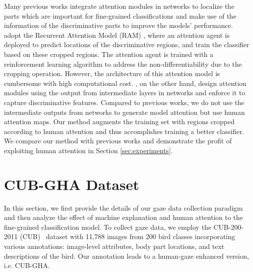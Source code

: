 \documentclass{bmvc2k}
\begin{document}
 Many previous works \cite{zheng2017learning, sun2018multi, liu2016fully,zhang2021multi,liu2017localizing,li2017dynamic,sermanet2014attention,fu2017look,zheng2019looking,zhuang2020learning,ji2020attention} integrate attention modules in networks to localize the parts which are important for fine-grained classifications and make use of the information of the discriminative parts to improve the models' performance.
\cite{liu2017localizing,sermanet2014attention,liu2016fully,li2017dynamic,fu2017look} adopt the Recurrent Attention Model (RAM) \cite{mnih2014recurrent}, where an attention agent is deployed to predict locations of the discriminative regions, and train the classifier based on these cropped regions. The attention agent is trained with a reinforcement learning algorithm to address the non-differentiability due to the cropping operation. However, the architecture of this attention model is cumbersome with high computational cost.
\cite{zheng2017learning, sun2018multi,zhang2021multi,zheng2019looking, zhuang2020learning, ji2020attention}, on the other hand, design attention modules using the output from intermediate layers in networks and enforce it to capture discriminative features. Compared to previous works, we do not use the intermediate outputs from networks to generate model attention but use human attention maps. Our method augments the training set with regions cropped according to human attention and thus accomplishes training a better classifier. We compare our method with previous works and demonstrate the profit of exploiting human attention in Section \ref{sec:experiments}.










\section{CUB-GHA Dataset}
\label{sec:dataset}
In this section, we first provide the details of our gaze data collection paradigm and then analyze the effect of machine explanation and human attention to the fine-grained classification model. 
To collect gaze data, we employ the CUB-200-2011 (CUB)~\cite{WahCUB_200_2011} dataset with 11,788 images from 200 bird classes incorporating various annotations: image-level attributes, body part locations, and text descriptions of the bird. Our annotation leads to a human-gaze enhanced version, i.e. CUB-GHA.
\end{document}
